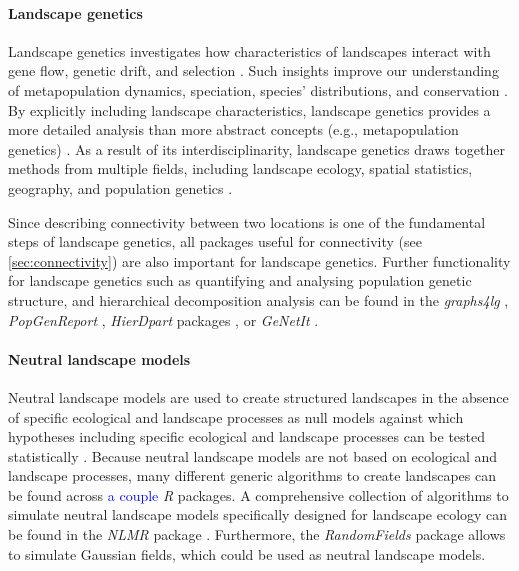 \documentclass[smallextended]{svjour3}       %
\begin{document}
\hypertarget{sec:landscape_genetics}{%
\paragraph{Landscape genetics}\label{sec:landscape_genetics}}

Landscape genetics investigates how characteristics of landscapes interact with gene flow, genetic drift, and selection \cite{Manel2003}.
Such insights improve our understanding of metapopulation dynamics, speciation, species' distributions, and conservation \cite{Storfer2007}.
By explicitly including landscape characteristics, landscape genetics provides a more detailed analysis than more abstract concepts (e.g., metapopulation genetics) \cite{Holderegger2006}.
As a result of its interdisciplinarity, landscape genetics draws together methods from multiple fields, including landscape ecology, spatial statistics, geography, and population genetics \cite{Storfer2007}.

Since describing connectivity between two locations is one of the fundamental steps of landscape genetics, all packages useful for connectivity (see \ref{sec:connectivity}) are also important for landscape genetics.
Further functionality for landscape genetics such as quantifying and analysing population genetic structure, and hierarchical decomposition analysis can be found in the \emph{graphs4lg} \cite{Savary2020}, \emph{PopGenReport} \cite{Adamack2014,Gruber2015}, \emph{HierDpart} packages \cite{Qin2019}, or \emph{GeNetIt} \cite{Murphy2010}.

\hypertarget{sec:NLM}{%
\paragraph{Neutral landscape models}\label{sec:NLM}}

Neutral landscape models are used to create structured landscapes in the absence of specific ecological and landscape processes as null models against which hypotheses including specific ecological and landscape processes can be tested statistically \cite{Gardner1987,With1997}.
Because neutral landscape models are not based on ecological and landscape processes, many different generic algorithms to create landscapes can be found across \textcolor{blue}{a couple} \emph{R} packages.
A comprehensive collection of algorithms to simulate neutral landscape models specifically designed for landscape ecology can be found in the \emph{NLMR} package \cite{Sciaini2018}.
Furthermore, the \emph{RandomFields} package \cite{Schlather2015} allows to simulate Gaussian fields, which could be used as neutral landscape models.
\end{document}
